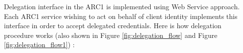 \documentclass{article}                            %
\begin{document}
\begin{figure}
\end{figure}

Delegation interface in the ARC1 is implemented using Web Service approach. Each ARC1 service wishing to act on behalf of client identity implements this interface in order to accept delegated credentials. Here is how delegation procedure works (also shown in Figure \ref{fig:delegation_flow} and Figure \ref{fig:delegation_flow1}) :
\end{document}
